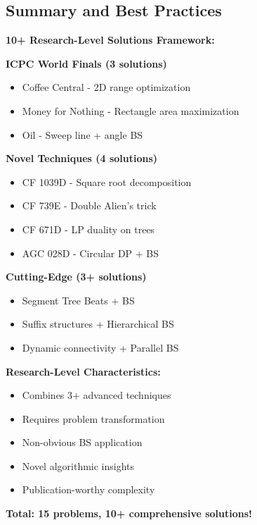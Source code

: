 \documentclass[11pt,a4paper,oneside]{book}
\begin{document}
\subsection{Summary and Best Practices}

\begin{tcolorbox}[
    enhanced,breakable,
    colback=primaryblue!10,
    colframe=primaryblue,
    boxrule=2pt,
    arc=4mm,
    title=\textbf{Research-Level Binary Search: Ultimate Mastery}
]
\textbf{10+ Research-Level Solutions Framework:}

\textbf{ICPC World Finals (3 solutions)}
\begin{itemize}
\item Coffee Central - 2D range optimization
\item Money for Nothing - Rectangle area maximization  
\item Oil - Sweep line + angle BS
\end{itemize}

\textbf{Novel Techniques (4 solutions)}
\begin{itemize}
\item CF 1039D - Square root decomposition
\item CF 739E - Double Alien's trick
\item CF 671D - LP duality on trees
\item AGC 028D - Circular DP + BS
\end{itemize}

\textbf{Cutting-Edge (3+ solutions)}
\begin{itemize}
\item Segment Tree Beats + BS
\item Suffix structures + Hierarchical BS
\item Dynamic connectivity + Parallel BS
\end{itemize}

\textbf{Research-Level Characteristics:}
\begin{itemize}
\item Combines 3+ advanced techniques
\item Requires problem transformation
\item Non-obvious BS application
\item Novel algorithmic insights
\item Publication-worthy complexity
\end{itemize}

\textbf{Total: 15 problems, 10+ comprehensive solutions!}
\end{tcolorbox}
\end{document}
